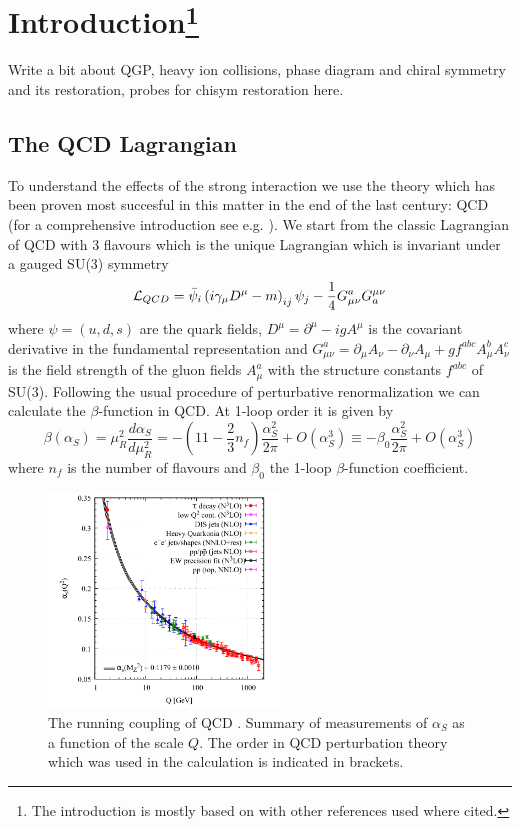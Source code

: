 \section{Introduction\footnote{The introduction is mostly based on \cite{ChiSym} with other references used where cited.}}
\label{sec:Introduction}
Write a bit about QGP, heavy ion collisions, phase diagram and chiral symmetry and its restoration, probes for chisym restoration here.

\subsection{The QCD Lagrangian}
To understand the effects of the strong interaction we use the theory which has been proven most succesful in this matter in the end of the last century: QCD (for a comprehensive introduction see e.g. \cite{QCDEllis}). We start from the classic Lagrangian of QCD with 3 flavours which is the unique Lagrangian which is invariant under a gauged SU(3) symmetry
\begin{equation}
\label{eqn:LQCD}
\mathcal{L}_{QCD} = \bar{\psi}_i \left( i\gamma_{\mu} D^{\mu} - m \right)_{ij} \psi_j - \frac{1}{4} G_{\mu\nu}^a G^{\mu\nu}_a
\end{equation}
where $\psi = \left( u,d,s \right)$ are the quark fields, $D^{\mu} = \partial^{\mu} -igA^{\mu}$ is the covariant derivative in the fundamental representation and $G_{\mu\nu}^a = \partial_{\mu}A_{\nu} - \partial_{\nu}A_{\mu} + g f^{abc} A_{\mu}^b A_{\nu}^c$ is the field strength of the gluon fields $A_{\mu}^a$ with the structure constants $f^{abc}$ of SU(3).
Following the usual procedure of perturbative renormalization we can calculate the $\beta$-function in QCD. At 1-loop order it is given by
\begin{equation}
\label{eqn:beta}
\beta(\alpha_S) = \mu_R^2 \frac{d\alpha_S}{d\mu_R^2} = - \left( 11 - \frac{2}{3} n_f \right) \frac{\alpha_S^2}{2\pi} + O(\alpha_S^3)  \equiv - \beta_0 \frac{\alpha_S^2}{2\pi} + O(\alpha_S^3)
\end{equation}
where $n_f$ is the number of flavours and $\beta_0$ the 1-loop $\beta$-function coefficient.
\begin{figure}[b]
	\centering
	\includegraphics[width=0.55\textwidth]{Figures/alphaQCD}
	\caption{The running coupling of QCD \cite{PDG2018}. Summary of measurements of $\alpha_S$ as a function of the scale $Q$. The order in QCD perturbation theory which was used in the calculation is indicated in brackets.}
	\label{fig:alpha}
\end{figure}
